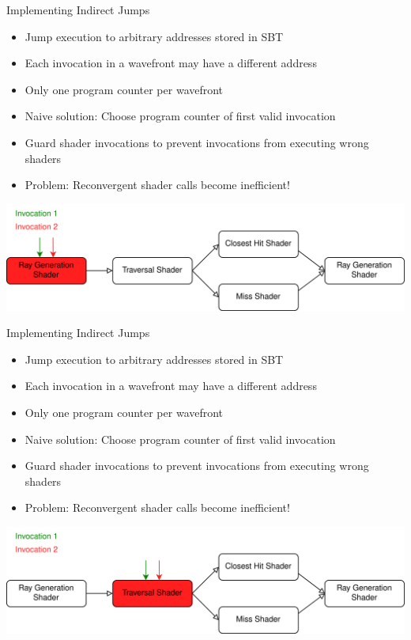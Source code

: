 \documentclass[aspectratio=169,t]{beamer}
\begin{document}
\begin{slide}{Implementing Indirect Jumps}
 \begin{itemize}
  \item Jump execution to arbitrary addresses stored in SBT
  \item Each invocation in a wavefront may have a different address
  \item Only one program counter per wavefront
  \item Naive solution: Choose program counter of first valid invocation
  \item Guard shader invocations to prevent invocations from executing wrong shaders
  \item Problem: Reconvergent shader calls become inefficient!
 \end{itemize}
 \pause
 \includegraphics[width=\textwidth]{graphics/RTStages2-1.png}
\end{slide}

\begin{slide}{Implementing Indirect Jumps}
 \begin{itemize}
  \item Jump execution to arbitrary addresses stored in SBT
  \item Each invocation in a wavefront may have a different address
  \item Only one program counter per wavefront
  \item Naive solution: Choose program counter of first valid invocation
  \item Guard shader invocations to prevent invocations from executing wrong shaders
  \item Problem: Reconvergent shader calls become inefficient!
 \end{itemize}
 \includegraphics[width=\textwidth]{graphics/RTStages2-2.png}
\end{slide}
\end{document}
